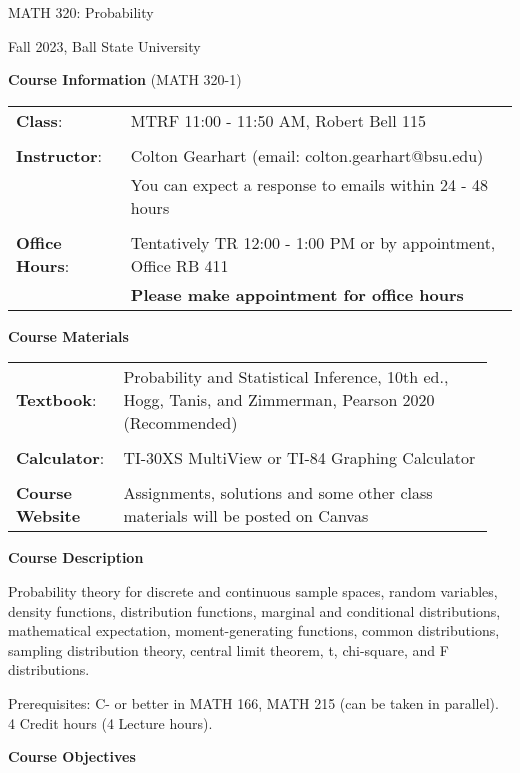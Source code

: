 \documentclass{article}
\begin{document}
\begin{center}
\Huge{MATH 320: Probability}

\large{Fall 2023, Ball State University}
\end{center}

\bigskip\bigskip

\textbf{\large Course Information} (MATH 320-1)\medskip

\begin{tabular}{ll}
    \textbf{Class}: & MTRF 11:00 - 11:50 AM, Robert Bell 115\\\\
    \textbf{Instructor}: & Colton Gearhart (email: colton.gearhart@bsu.edu) \\
     & You can expect a response to emails within 24 - 48 hours \\\\
    \textbf{Office Hours}: & Tentatively TR 12:00 - 1:00 PM or by appointment, Office RB 411 \\
     & \textbf{Please make appointment for office hours}
\end{tabular}\bigskip

\textbf{\large Course Materials}\medskip

\begin{tabular}{p{0.2\linewidth}p{0.75\linewidth}}
    \textbf{Textbook}: & Probability and Statistical Inference, 10th ed., Hogg, Tanis, and Zimmerman, Pearson 2020 (Recommended)\\\\
    \textbf{Calculator}: & TI-30XS MultiView or TI-84 Graphing Calculator\\\\
    \textbf{Course Website} & Assignments, solutions and some other class materials will be posted on Canvas
\end{tabular}\bigskip

\textbf{\large Course Description}\medskip

Probability theory for discrete and continuous sample spaces, random variables, density functions, distribution functions, marginal and conditional distributions, mathematical expectation, moment-generating functions, common distributions, sampling distribution theory, central limit theorem, t, chi-square, and F distributions.

Prerequisites: C- or better in MATH 166, MATH 215 (can be taken in parallel).\\
4 Credit hours (4 Lecture hours).\bigskip

\textbf{\large Course Objectives}\medskip
\end{document}
